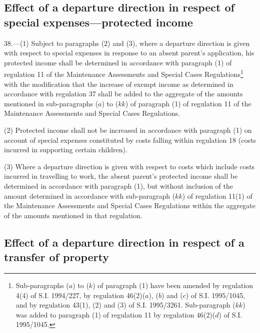 \documentclass[12pt,a4paper]{article}
\begin{document}

\subsection[38. Effect of a departure direction in respect of special expenses—\hspace{0pt}protected
income]{\sloppy Effect of a departure direction in respect of special expenses—\hspace{0pt}protected
income}

38.—(1) Subject to paragraphs (2) and (3), where a departure direction is
given with respect to special expenses in response to an absent parent’s
application, his protected income shall be determined in accordance with
paragraph (1) of regulation 11 of the Maintenance Assessments and Special Cases
Regulations\footnote{\frenchspacing Sub-paragraphs ($a$) to ($k$) of paragraph (1) have been amended by regulation 4(4) of S.I. 1994/227, by regulation 46(2)($a$), ($b$) and ($c$) of S.I. 1995/1045, and by regulation 43(1), (2) and (3) of S.I. 1995/3261. Sub-paragraph ($kk$) was added to paragraph (1) of regulation 11 by regulation 46(2)($d$) of S.I. 1995/1045.} with the modification that the increase of exempt income as
determined in accordance with regulation 37 shall be added to the aggregate of
the amounts mentioned in sub-paragraphs ($a$) to ($kk$) of paragraph (1) of
regulation 11 of the Maintenance Assessments and Special Cases Regulations.

(2) Protected income shall not be increased in accordance with paragraph (1) on
account of special expenses constituted by costs falling within regulation 18
(costs incurred in supporting certain children).

(3) Where a departure direction is given with respect to costs which include
costs incurred in travelling to work, the absent parent’s protected income shall
be determined in accordance with paragraph (1), but without inclusion of the
amount determined in accordance with sub-paragraph ($kk$) of regulation 11(1) of
the Maintenance Assessments and Special Cases Regulations within the aggregate
of the amounts mentioned in that regulation.

\subsection[39. Effect of a departure direction in respect of a transfer of property]{Effect of a departure direction in respect of a transfer of property}
\end{document}
